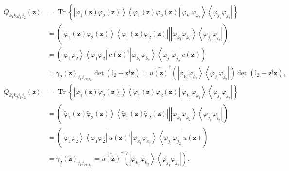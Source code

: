 \documentclass[aps,preprint]{revtex4}%
\begin{document}
\begin{align}
Q_{k_{1}k_{2}j_{1}j_{2}}\left(  \mathbf{z}\right)   &  =\operatorname*{Tr}%
\left\{  \left\vert \varphi_{1}\left(  \mathbf{z}\right)  \varphi_{2}\left(
\mathbf{z}\right)  \right\rangle \left\langle \varphi_{1}\left(
\mathbf{z}\right)  \varphi_{2}\left(  \mathbf{z}\right)  \right\vert
\left\vert \varphi_{k_{1}}\varphi_{k_{2}}\right\rangle \left\langle
\varphi_{j_{1}}\varphi_{j_{2}}\right\vert \right\}  \nonumber\\
&  =\left(  \left.  \overset{}{\left\vert \varphi_{1}\left(  \mathbf{z}%
\right)  \varphi_{2}\left(  \mathbf{z}\right)  \right\rangle \left\langle
\varphi_{1}\left(  \mathbf{z}\right)  \varphi_{2}\left(  \mathbf{z}\right)
\right\vert }\right\vert \overset{}{\left\vert \varphi_{k_{1}}\varphi_{k_{2}%
}\right\rangle \left\langle \varphi_{j_{1}}\varphi_{j_{2}}\right\vert
}\right)  \nonumber\\
&  =\left(  \left.  \overset{}{\left\vert \varphi_{1}\varphi_{2}\right\rangle
\left\langle \varphi_{1}\varphi_{2}\right\vert }\right\vert c\left(
\mathbf{z}\right)  ^{\dagger}\left\vert \varphi_{k_{1}}\varphi_{k_{2}%
}\right\rangle \left\langle \varphi_{j_{1}}\varphi_{j_{2}}\right\vert c\left(
\mathbf{z}\right)  \right)  \nonumber\\
&  =\gamma_{2}\left(  \mathbf{z}\right)  _{j_{1}j_{2k_{1}k_{2}}}\det\left(
\mathbb{I}_{2}+\mathbf{z}^{\dagger}\mathbf{z}\right)  =\widehat{u\left(
\mathbf{z}\right)  }^{\dagger}\left(  \left\vert \varphi_{k_{1}}\varphi
_{k_{2}}\right\rangle \left\langle \varphi_{j_{1}}\varphi_{j_{2}}\right\vert
\right)  \det\left(  \mathbb{I}_{2}+\mathbf{z}^{\dagger}\mathbf{z}\right)
,\nonumber\\
\tilde{Q}_{k_{1}k_{2}j_{1}j_{2}}\left(  \mathbf{z}\right)   &
=\operatorname*{Tr}\left\{  \left\vert \tilde{\varphi}_{1}\left(
\mathbf{z}\right)  \tilde{\varphi}_{2}\left(  \mathbf{z}\right)  \right\rangle
\left\langle \tilde{\varphi}_{1}\left(  \mathbf{z}\right)  \tilde{\varphi}%
_{2}\left(  \mathbf{z}\right)  \right\vert \left\vert \varphi_{k_{1}}%
\varphi_{k_{2}}\right\rangle \left\langle \varphi_{j_{1}}\varphi_{j_{2}%
}\right\vert \right\}  \nonumber\\
&  =\left(  \left.  \overset{}{\left\vert \tilde{\varphi}_{1}\left(
\mathbf{z}\right)  \tilde{\varphi}_{2}\left(  \mathbf{z}\right)  \right\rangle
\left\langle \tilde{\varphi}_{1}\left(  \mathbf{z}\right)  \tilde{\varphi}%
_{2}\left(  \mathbf{z}\right)  \right\vert }\right\vert \overset{}{\left\vert
\varphi_{k_{1}}\varphi_{k_{2}}\right\rangle \left\langle \varphi_{j_{1}%
}\varphi_{j_{2}}\right\vert }\right)  \nonumber\\
&  =\left(  \left.  \overset{}{\left\vert \varphi_{1}\varphi_{2}\right\rangle
\left\langle \varphi_{1}\varphi_{2}\right\vert }\right\vert
\overset{}{u\left(  \mathbf{z}\right)  ^{\dagger}\left\vert \varphi_{k_{1}%
}\varphi_{k_{2}}\right\rangle \left\langle \varphi_{j_{1}}\varphi_{j_{2}%
}\right\vert }u\left(  \mathbf{z}\right)  \right)  \nonumber\\
&  =\gamma_{2}\left(  \mathbf{z}\right)  _{j_{1}j_{2k_{1}k_{2}}}%
=\widehat{u\left(  \mathbf{z}\right)  }^{\dagger}\left(  \left\vert
\varphi_{k_{1}}\varphi_{k_{2}}\right\rangle \left\langle \varphi_{j_{1}%
}\varphi_{j_{2}}\right\vert \right)  .
\end{align}
\end{document}
